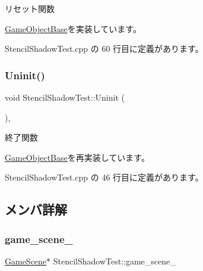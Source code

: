 リセット関数 



\mbox{\hyperlink{class_game_object_base_a85c59554f734bcb09f1a1e18d9517dce}{Game\+Object\+Base}}を実装しています。



 Stencil\+Shadow\+Test.\+cpp の 60 行目に定義があります。

\mbox{\label{class_stencil_shadow_test_a51b5d75aaba5673a13f950bd6b742720}} 
\subsubsection{\texorpdfstring{Uninit()}{Uninit()}}
{\footnotesize\ttfamily void Stencil\+Shadow\+Test\+::\+Uninit (\begin{DoxyParamCaption}{ }\end{DoxyParamCaption})\hspace{0.3cm}{\ttfamily [override]}, {\ttfamily [virtual]}}



終了関数 



\mbox{\hyperlink{class_game_object_base_a97e1bc277d7b1c0156d4735de29a022c}{Game\+Object\+Base}}を再実装しています。



 Stencil\+Shadow\+Test.\+cpp の 46 行目に定義があります。



\subsection{メンバ詳解}
\mbox{\label{class_stencil_shadow_test_ac108faf317516a8335f73ca8005fbb20}} 
\subsubsection{\texorpdfstring{game\+\_\+scene\+\_\+}{game\_scene\_}}
{\footnotesize\ttfamily \mbox{\hyperlink{class_game_scene}{Game\+Scene}}$\ast$ Stencil\+Shadow\+Test\+::game\+\_\+scene\+\_\+}



